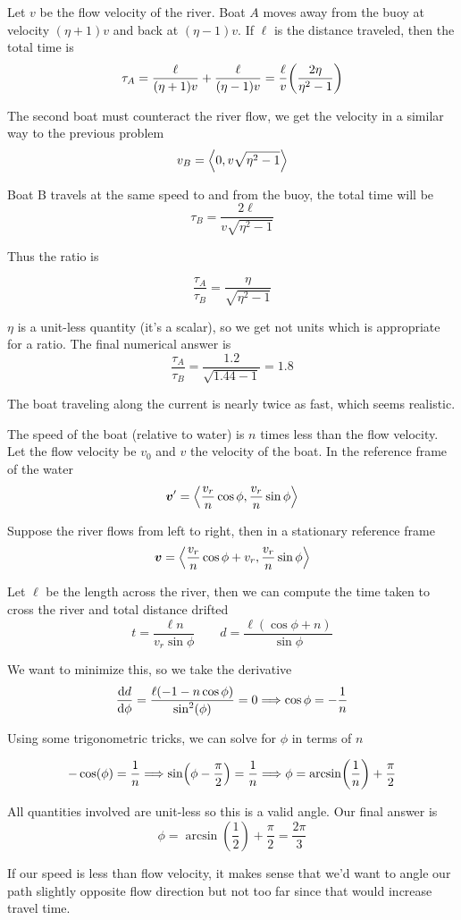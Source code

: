 \begin{exercise}
Let $v$ be the flow velocity of the river. Boat $A$ moves away from the buoy at velocity $(\eta + 1)v$ and back at $(\eta - 1)v$. If $\ell$ is the distance traveled, then the total time is
\[ \tau_A = \frac{\ell}{(\eta + 1)v} + \frac{\ell}{(\eta - 1)v} = \frac{\ell}{v} \qty(\frac{2\eta}{\eta^2 - 1}) \]

The second boat must counteract the river flow, we get the velocity in a similar way to the previous problem
\[ v_B = \left\langle 0, v\sqrt{\eta^2 - 1} \right\rangle \]

Boat B travels at the same speed to and from the buoy, the total time will be
\[ \tau_B = \frac{2\ell}{v\sqrt{\eta^2 - 1}} \]

Thus the ratio is
\begin{answer}
	\[ \frac{\tau_A}{\tau_B} = \frac{\eta}{\sqrt{\eta^2 - 1}} \]
\end{answer}

$\eta$ is a unit-less quantity (it's a scalar), so we get not units which is appropriate for a ratio. The final numerical answer is
\[ \frac{\tau_A}{\tau_B} = \frac{1.2}{\sqrt{1.44 - 1}} = 1.8 \]

The boat traveling along the current is nearly twice as fast, which seems realistic.
\end{exercise}


\begin{exercise}
The speed of the boat (relative to water) is $n$ times less than the flow velocity. Let the flow velocity be $v_0$ and $v$ the velocity of the boat. In the reference frame of the water
\[ \vec v' = \vbrack{\frac{v_r}{n} \cos\phi, \frac{v_r}{n} \sin\phi} \]

Suppose the river flows from left to right, then in a stationary reference frame
\[ \vec v = \vbrack{\frac{v_r}{n} \cos\phi + v_r, \frac{v_r}{n} \sin\phi} \]

Let $\ell$ be the length across the river, then we can compute the time taken to cross the river and total distance drifted
\[ t = \frac{\ell n}{v_r \sin\phi} \qquad d = \frac{\ell (\cos\phi + n)}{\sin\phi} \]

We want to minimize this, so we take the derivative
\[ \dv{d}{\phi} = \frac{\ell (-1 - n \cos\phi)}{\sin^2(\phi)} = 0 \Longrightarrow \cos\phi = -\frac{1}{n} \]

\newpage 
Using some trigonometric tricks, we can solve for $\phi$ in terms of $n$
\begin{answer}
	\[ -\cos(\phi) = \frac{1}{n} \Longrightarrow \sin(\phi - \frac{\pi}{2}) = \frac{1}{n} \Longrightarrow \phi = \arcsin(\frac{1}{n}) + 		\frac{\pi}{2} \]
\end{answer}

All quantities involved are unit-less so this is a valid angle. Our final answer is
\[ \phi = \arcsin(\frac{1}{2}) + \frac{\pi}{2} = \frac{2 \pi}{3} \]

If our speed is less than flow velocity, it makes sense that we'd want to angle our path slightly opposite flow direction but not too far since that would increase travel time.
\end{exercise}


